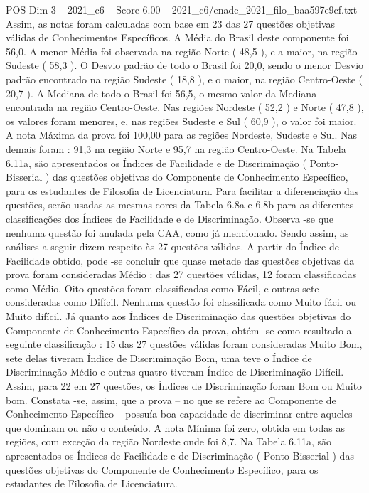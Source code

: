 \begin{textsample}{POS Dim 3 – 2021\_c6 – Score 6.00 – 2021\_c6/enade\_2021\_filo\_baa597e9cf.txt}
Assim, as notas foram calculadas com base em 23 das 27 questões objetivas válidas de Conhecimentos Específicos.
A Média do Brasil deste componente foi 56,0.
A menor Média foi observada na região Norte ( 48,5 ), e a maior, na região Sudeste ( 58,3 ).
O Desvio padrão de todo o Brasil foi 20,0, sendo o menor Desvio padrão encontrado na região Sudeste ( 18,8 ), e o maior, na região Centro-Oeste ( 20,7 ).
A Mediana de todo o Brasil foi 56,5, o mesmo valor da Mediana encontrada na região Centro-Oeste.
Nas regiões Nordeste ( 52,2 ) e Norte ( 47,8 ), os valores foram menores, e, nas regiões Sudeste e Sul ( 60,9 ), o valor foi maior.
A nota Máxima da prova foi 100,00 para as regiões Nordeste, Sudeste e Sul.
Nas demais foram : 91,3 na região Norte e 95,7 na região Centro-Oeste.
Na Tabela 6.11a, são apresentados os Índices de Facilidade e de Discriminação ( Ponto-Bisserial ) das questões objetivas do Componente de Conhecimento Específico, para os estudantes de Filosofia de Licenciatura.
Para facilitar a diferenciação das questões, serão usadas as mesmas cores da Tabela 6.8a e 6.8b para as diferentes classificações dos Índices de Facilidade e de Discriminação.
Observa -se que nenhuma questão foi anulada pela CAA, como já mencionado.
Sendo assim, as análises a seguir dizem respeito às 27 questões válidas.
A partir do Índice de Facilidade obtido, pode -se concluir que quase metade das questões objetivas da prova foram consideradas Médio : das 27 questões válidas, 12 foram classificadas como Médio.
Oito questões foram classificadas como Fácil, e outras sete consideradas como Difícil.
Nenhuma questão foi classificada como Muito fácil ou Muito difícil.
Já quanto aos Índices de Discriminação das questões objetivas do Componente de Conhecimento Específico da prova, obtém -se como resultado a seguinte classificação : 15 das 27 questões válidas foram consideradas Muito Bom, sete delas tiveram Índice de Discriminação Bom, uma teve o Índice de Discriminação Médio e outras quatro tiveram Índice de Discriminação Difícil.
Assim, para 22 em 27 questões, os Índices de Discriminação foram Bom ou Muito bom.
Constata -se, assim, que a prova – no que se refere ao Componente de Conhecimento Específico – possuía boa capacidade de discriminar entre aqueles que dominam ou não o conteúdo.
A nota Mínima foi zero, obtida em todas as regiões, com exceção da região Nordeste onde foi 8,7.
Na Tabela 6.11a, são apresentados os Índices de Facilidade e de Discriminação ( Ponto-Bisserial ) das questões objetivas do Componente de Conhecimento Específico, para os estudantes de Filosofia de Licenciatura.

\end{textsample}
